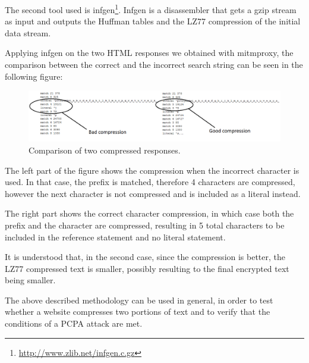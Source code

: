 The second tool used is infgen\footnote{\url{http://www.zlib.net/infgen.c.gz}}.
Infgen is a disassembler that gets a gzip stream as input and outputs the
Huffman tables and the LZ77 compression of the initial data stream.

Applying infgen on the two HTML responses we obtained with mitmproxy, the
comparison between the correct and the incorrect search string can be seen in
the following figure:

\begin{figure}[H] \caption{Comparison of two compressed responses.}
\includegraphics[width=1.15\textwidth]{diagrams/compression_comparison.png}\end{figure}

The left part of the figure shows the compression when the incorrect character
is used. In that case, the prefix is matched, therefore 4 characters are
compressed, however the next character is not compressed and is included as a
literal instead.

The right part shows the correct character compression, in which case both the
prefix and the character are compressed, resulting in 5 total characters to be
included in the reference statement and no literal statement.

It is understood that, in the second case, since the compression is better, the
LZ77 compressed text is smaller, possibly resulting to the final encrypted text
being smaller.

The above described methodology can be used in general, in order to test whether
a website compresses two portions of text and to verify that the conditions of a
PCPA attack are met.
